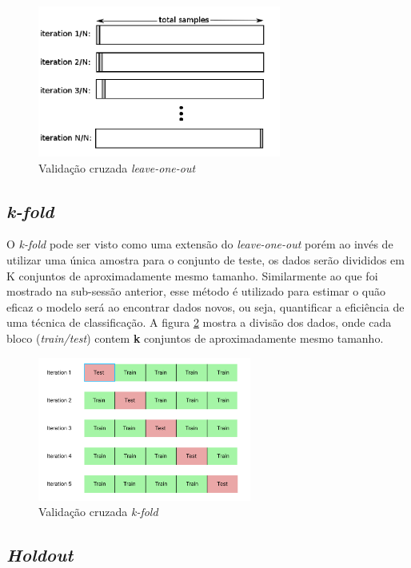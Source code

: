 \documentclass[paper=a4, fontsize=11pt]{scrartcl}
\numberwithin{equation}{section}		%
\numberwithin{figure}{section}			%
\numberwithin{table}{section}				%
\begin{document}
\begin{figure}[h]
    \includegraphics[width=8cm]{img/Leave-One-Out-Cross-Validation.png}
    \centering
    \caption{Validação cruzada \textit{leave-one-out}}
    \label{fig:loo}
\end{figure}

\subsection{\textit{k-fold}}

O \textit{k-fold} pode ser visto como uma extensão do \textit{leave-one-out} porém ao invés de utilizar uma única amostra para o conjunto de teste, os dados serão divididos em K conjuntos de aproximadamente mesmo tamanho. Similarmente ao que foi mostrado na sub-sessão anterior, esse método é utilizado para estimar o quão eficaz o modelo será ao encontrar dados novos, ou seja, quantificar a eficiência de uma técnica de classificação. A figura \ref{fig:kfold} mostra a divisão dos dados, onde cada bloco (\textit{train/test}) contem \textbf{k} conjuntos de aproximadamente mesmo tamanho.

\begin{figure}[h!]
    \includegraphics[width=7cm]{img/k-fold1.png}
    \centering
    \caption{Validação cruzada \textit{k-fold}}
    \label{fig:kfold}
\end{figure}

\subsection{\textit{Holdout}}
\end{document}
